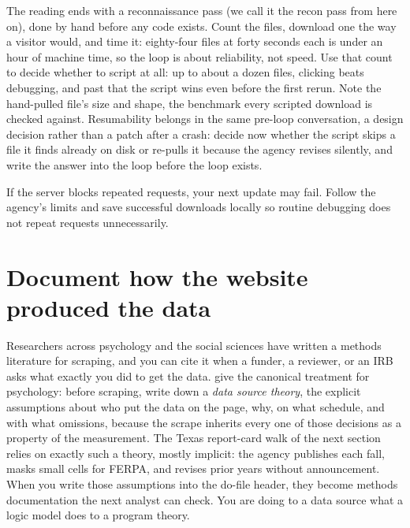 The reading ends with a reconnaissance pass (we call it the recon pass from here on), done by hand before any code exists. Count the files, download one the way a visitor would, and time it: eighty-four files at forty seconds each is under an hour of machine time, so the loop is about reliability, not speed. Use that count to decide whether to script at all: up to about a dozen files, clicking beats debugging, and past that the script wins even before the first rerun. Note the hand-pulled file's size and shape, the benchmark every scripted download is checked against. Resumability belongs in the same pre-loop conversation, a design decision rather than a patch after a crash: decide now whether the script skips a file it finds already on disk or re-pulls it because the agency revises silently, and write the answer into the loop before the loop exists.

If the server blocks repeated requests, your next update may fail. Follow the agency's limits and save successful downloads locally so routine debugging does not repeat requests unnecessarily.

\section{Document how the website produced the data}\label{sec:ch04-scrapelit}
Researchers across psychology and the social sciences have written a methods literature for scraping, and you can cite it when a funder, a reviewer, or an IRB asks what exactly you did to get the data. \textcite{landers2016scraping} give the canonical treatment for psychology: before scraping, write down a \emph{data source theory}, the explicit assumptions about who put the data on the page, why, on what schedule, and with what omissions, because the scrape inherits every one of those decisions as a property of the measurement. The Texas report-card walk of the next section relies on exactly such a theory, mostly implicit: the agency publishes each fall, masks small cells for FERPA, and revises prior years without announcement. When you write those assumptions into the do-file header, they become methods documentation the next analyst can check. You are doing to a data source what a logic model does to a program theory.

